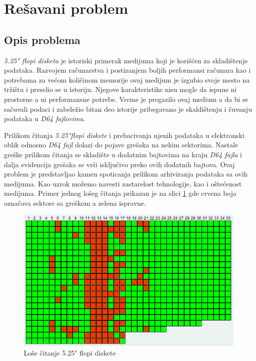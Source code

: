 \section{Rešavani problem}

\subsection{Opis problema}

\textit{5.25" flopi disketa} je istoriski primerak medijuma koji je korišćen za  \newline skladištenje podataka. Razvojem računarstva i postizanjem boljih performansi računara kao i potrebama za većom količinom memorije ovaj medijum je izgubio svoje mesto na tržištu i preselio se u istoriju. Njegove karakteristike nisu mogle da ispune ni prostorne a ni performansne potrebe.  Vreme je pregazilo ovaj medium a da bi se sačuvali podaci i zabeležio bitan deo istorije pribegavano je skaldištenju i čuvanju podataka u \textit{D64 fajlovima}.

Prilikom čitanja \textit{5.25"flopi diskete} i prebacivanja njenih podataka u elektronski oblik odnosno \textit{D64 fajl} dolazi do pojave grešaka na nekim sektorima. Nastale greške prilikom čitanja se skladište u dodatnim bajtovima na kraju \textit{D64 fajla} i dalja evidencija grešaka se vrši isključivo preko ovih dodatnih bajtova. Ovaj problem je predstavljao kamen spoticanja prilikom arhiviranja podataka sa ovih medijuma. Kao uzrok možemo navesti zastarelost tehnologije, kao i oštećenost medijuma. Primer jednog lošeg čitanja prikazan je na slici \ref{img:loseCitanje} gde crvena boja označava sektore sa greškom a zelena ispravne.

\begin{figure}[ht]
\begin{center}
\includegraphics{img/loseCitanje.png}
\caption{Loše čitanje 5.25" flopi diskete}
\label{img:loseCitanje}
\end{center}
\end{figure}

